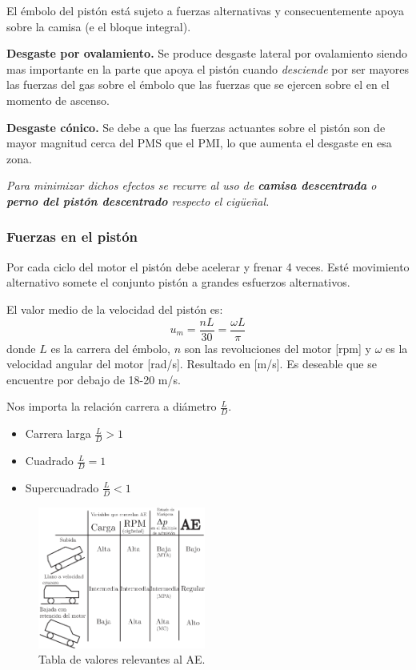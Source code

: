 El émbolo del pistón está sujeto a fuerzas alternativas y consecuentemente apoya sobre la camisa (e el bloque integral).

\textbf{Desgaste por ovalamiento.} Se produce desgaste lateral por ovalamiento siendo mas importante en la parte que apoya el pistón cuando \textit{desciende} por ser mayores las fuerzas del gas sobre el émbolo que las fuerzas que se ejercen sobre el en el momento de ascenso.

\textbf{Desgaste cónico.} Se debe a que las fuerzas actuantes sobre el pistón son de mayor magnitud cerca del PMS que el PMI, lo que aumenta el desgaste en esa zona. 

\textit{Para minimizar dichos efectos se recurre al uso de \textbf{camisa descentrada} o \textbf{perno del pistón descentrado} respecto el cigüeñal.}



\subsubsection{Fuerzas en el pistón}
Por cada ciclo del motor el pistón debe acelerar y frenar 4 veces. Esté movimiento alternativo somete el conjunto pistón a grandes esfuerzos alternativos.

El valor medio de la velocidad del pistón es:
\[
u_m = \frac{nL}{30} = \frac{\omega L}{\pi}
\]
donde $L$ es la carrera del émbolo, $n$ son las revoluciones del motor [rpm] y $\omega$ es la velocidad angular del motor [rad/s]. Resultado en [m/s]. Es deseable que se encuentre por debajo de 18-20 m/s.

Nos importa la relación carrera a diámetro $\frac{L}{D}$.

\begin{itemize}
    \item Carrera larga $\frac{L}{D}>1$
    \item Cuadrado $\frac{L}{D}=1$
    \item Supercuadrado $\frac{L}{D}<1$
\end{itemize}

\begin{figure}[htb!]
    \centering
    \includegraphics[width=0.49\textwidth]{fig/diag_auto.eps}
    \caption{Tabla de valores relevantes al AE.}
    \label{fig:AEmotor}
\end{figure}


